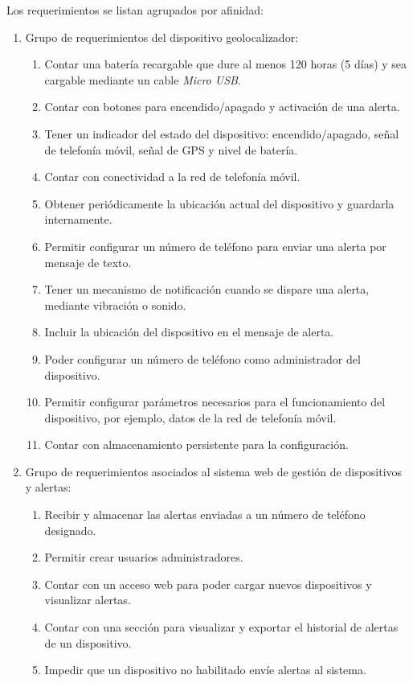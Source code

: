 \documentclass[
11pt, %
]{charter}
\begin{document}
Los requerimientos se listan agrupados por afinidad:

\begin{enumerate}
\item Grupo de requerimientos del dispositivo geolocalizador:
	\begin{enumerate}
	\item Contar una batería recargable que dure al menos 120 horas (5 días) y sea cargable mediante un cable \textit{Micro USB}.
	\item Contar con botones para encendido/apagado y activación de una alerta.
	\item Tener un indicador del estado del dispositivo: encendido/apagado, señal de telefonía móvil, señal de GPS y nivel de batería.
	\item Contar con conectividad a la red de telefonía móvil.
	\item Obtener periódicamente la ubicación actual del dispositivo y guardarla internamente.
	\item Permitir configurar un número de teléfono para enviar una alerta por mensaje de texto.
	\item Tener un mecanismo de notificación cuando se dispare una alerta, mediante vibración o sonido.
	\item Incluir la ubicación del dispositivo en el mensaje de alerta.
	\item Poder configurar un número de teléfono como administrador del dispositivo.
	\item Permitir configurar parámetros necesarios para el funcionamiento del dispositivo, por ejemplo, datos de la red de telefonía móvil.
	\item Contar con almacenamiento persistente para la configuración.
	\end{enumerate}
\item Grupo de requerimientos asociados al sistema web de gestión de dispositivos y alertas:
	\begin{enumerate}
	\item Recibir y almacenar las alertas enviadas a un número de teléfono designado.
	\item Permitir crear usuarios administradores.
	\item Contar con un acceso web para poder cargar nuevos dispositivos y visualizar alertas.
	\item Contar con una sección para visualizar y exportar el historial de alertas de un dispositivo.
	\item Impedir que un dispositivo no habilitado envíe alertas al sistema.

\end{enumerate}
\end{enumerate}
\end{document}
